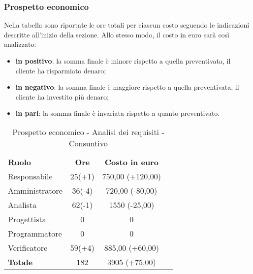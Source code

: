 \subsubsection{Prospetto economico}
Nella tabella sono riportate le ore totali per ciascun costo seguendo le indicazioni descritte all'inizio della sezione.
Allo stesso modo, il costo in euro sarà così analizzato:
\begin{itemize}
	\item {\bfseries in positivo}: la somma finale è minore rispetto a quella preventivata, il cliente ha risparmiato denaro;
	\item {\bfseries in negativo}: la somma finale è maggiore rispetto a quella preventivata, il cliente ha investito più denaro;
	\item {\bfseries in pari}: la somma finale è invariata rispetto a quanto preventivato. \\
\end{itemize}
\begin{table} [h!]
	\begin{center}
		\begin{tabular} { m{3 cm} c c c  }
			\rowcolor{lightgray}
			\textbf{Ruolo} & \textbf{Ore} & \textbf{Costo in euro} \\
			Responsabile & 25(+1) & 750,00 (+120,00) \\
			Amministratore & 36(-4) & 720,00 (-80,00)  \\
			Analista & 62(-1) & 1550 (-25,00) \\
			Progettista & 0 & 0 \\
			Programmatore & 0 & 0  \\
			Verificatore & 59(+4) & 885,00 (+60,00)  \\
			\textbf{Totale} & 182  & 3905 (+75,00) \\
			
		\end{tabular}
		\caption{Prospetto economico - Analisi dei requisiti - Consuntivo}
	\end{center}
\end{table}

